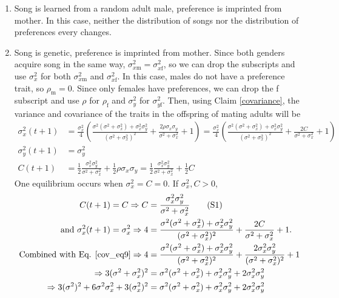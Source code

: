 \documentclass{article}
\newcommand{\x}[1]{\text{#1}}
\newcommand\numberthis{\addtocounter{equation}{1}\tag{\theequation}}
\begin{document}
\begin{enumerate}
\item Song is learned from a random adult male, preference is imprinted from mother. In this case, neither the distribution of songs nor the distribution of preferences every changes. 

\item Song is genetic, preference is imprinted from mother. Since both genders acquire song in the same way, $\sigma_{x\x{m}}^2=\sigma_{x\x{f}}^2$, so we can drop the subscripts and use $\sigma_x^2$ for both $\sigma_{x\x{m}}^2$ and $\sigma_{x\x{f}}^2$. In this case, males do not have a preference trait, so $\rho_\x{m}=0$. Since only females have preferences, we can drop the f subscript and use $\rho$ for $\rho_\x{f}$ and $\sigma_y^2$ for $\sigma_{y\x{f}}^2$. Then, using Claim \ref{covariance}, the variance and covariance of the traits in the offspring of mating adults will be
\begin{align}
\sigma_x^2(t+1)&=\frac{\sigma_x^2}{4}\left(\frac{\sigma^2(\sigma^2+\sigma_x^2)+\sigma_x^2\sigma_y^2}{(\sigma^2+\sigma_x^2)^2}+\frac{2\rho\sigma_x\sigma_y}{\sigma^2+\sigma_x^2}+1\right)=\frac{\sigma_x^2}{4}\left(\frac{\sigma^2(\sigma^2+\sigma_x^2)+\sigma_x^2\sigma_y^2}{(\sigma^2+\sigma_x^2)^2}+\frac{2C }{\sigma^2+\sigma_x^2}+1\right) \label{sigmax9}
\\ \sigma_y^2(t+1)&=\sigma_y^2
\\ C (t+1)&=\frac{1}{2}\frac{\sigma_x^2\sigma_y^2}{\sigma^2+\sigma_x^2}+\frac{1}{2}\rho\sigma_x\sigma_y=\frac{1}{2}\frac{\sigma_x^2\sigma_y^2}{\sigma^2+\sigma_x^2}+\frac{1}{2}C  \label{cov9}
\end{align}
One equilibrium occurs when $\sigma_x^2=C=0$. If $\sigma_x^2,C>0$, 
\begin{align*}
C (t+1)=C \Rightarrow C& =\frac{\sigma_x^2\sigma_y^2}{\sigma^2+\sigma_x^2} \numberthis \label{cov_eq9}
\\ \text{ and } \sigma_x^2(t+1)=\sigma_x^2\Rightarrow 4&=\frac{\sigma^2(\sigma^2+\sigma_x^2)+\sigma_x^2\sigma_y^2}{(\sigma^2+\sigma_x^2)^2}+\frac{2C }{\sigma^2+\sigma_x^2}+1.
\\ \text{Combined with Eq. \ref{cov_eq9}} \Rightarrow 4&=\frac{\sigma^2(\sigma^2+\sigma_x^2)+\sigma_x^2\sigma_y^2}{(\sigma^2+\sigma_x^2)^2}+\frac{2\sigma_x^2\sigma_y^2}{(\sigma^2+\sigma_x^2)^2}+1
\\\Rightarrow 3(\sigma^2+\sigma_x^2)^2&=\sigma^2(\sigma^2+\sigma_x^2)+\sigma_x^2\sigma_y^2+2\sigma_x^2\sigma_y^2
\\\Rightarrow 3(\sigma^2)^2+6\sigma^2\sigma_x^2+3(\sigma_x^2)^2&=\sigma^2(\sigma^2+\sigma_x^2)+\sigma_x^2\sigma_y^2+2\sigma_x^2\sigma_y^2

\end{align*}
\end{enumerate}
\end{document}
